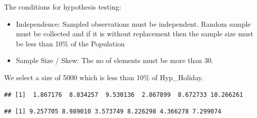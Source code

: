 \documentclass[]{article}
\newenvironment{Shaded}{\begin{snugshade}}{\end{snugshade}}
\newcommand{\KeywordTok}[1]{\textcolor[rgb]{0.13,0.29,0.53}{\textbf{{#1}}}}
\newcommand{\DecValTok}[1]{\textcolor[rgb]{0.00,0.00,0.81}{{#1}}}
\newcommand{\StringTok}[1]{\textcolor[rgb]{0.31,0.60,0.02}{{#1}}}
\newcommand{\NormalTok}[1]{{#1}}
\begin{document}
The conditions for hypothesis testing:

\begin{itemize}
\itemsep1pt\parskip0pt
\item
  Independence: Sampled observations must be independent. Random sample
  must be collected and if it is without replacement then the sample
  size must be less than 10\% of the Population
\item
  Sample Size / Skew: The no of elements must be more than 30.
\end{itemize}

We select a size of 5000 which is less than 10\% of Hyp\_Holiday.

\begin{Shaded}
\end{Shaded}

\begin{verbatim}
## [1]  1.867176  8.834257  9.530136  2.867899  8.672733 10.266261
\end{verbatim}

\begin{Shaded}
\end{Shaded}

\begin{verbatim}
## [1] 9.257705 8.989010 3.573749 8.226298 4.366278 7.299074
\end{verbatim}
\end{document}
